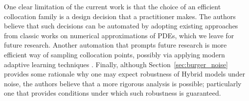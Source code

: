 One clear limitation of the current work is that the choice of an efficient collocation family is a design decision that a practitioner makes. The authors believe that such decisions can be automated by adopting existing approaches from classic works on numerical approximations of PDEs, which we leave for future research. Another automation that prompts future research is more efficient way of sampling collocation points, possibly via applying modern adaptive learning techniques \cite{subramanian2022adaptive}. Finally, although Section~\ref{sec:burger_noise} provides some rationale why one may expect robustness of Hybrid models under noise, the authors believe that a more rigorous analysis is possible; particularly one that provides conditions under which such robustness is guaranteed. 